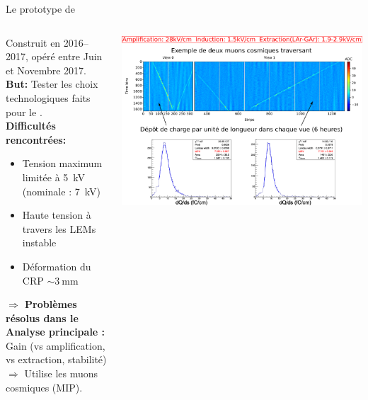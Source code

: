     \begin{frame}{Le prototype de \TOO{}}
    	\begin{scriptsize}
    		\vfill
    		\begin{columns}
    			\begin{column}{0.35\textwidth}
    				Construit en 2016--2017, opéré entre Juin et Novembre 2017.\\
    				\vspace{0.3cm}
    				\textbf{But:} Tester les choix technologiques faits pour le \SSS{}.\\
    				\vspace{0.3cm}
    				\textbf{Difficultés rencontrées:} 
    				\begin{itemize}
    					\item Tension maximum limitée à \SI{5}{\kilo\volt} (nominale : \SI{7}{\kilo\volt})
    					\item Haute tension à travers les LEMs instable
    					\item Déformation du CRP $\sim\SI{3}{\milli\meter}$
    				\end{itemize}
    				\textbf{$\Rightarrow$ Problèmes résolus dans le \SSS{}} \\
    				\vspace{0.3cm}
    				\textbf{Analyse principale :} Gain (vs amplification, vs extraction, stabilité)\\
    				$\Rightarrow$ Utilise les muons cosmiques (MIP).
    			\end{column}\hfill
    			\begin{column}{0.65\textwidth}
    				\includegraphics[width=\textwidth]{./pictures/run840.png}\\
    			\end{column}
    		\end{columns}
	    \end{scriptsize}
    \end{frame}
    
